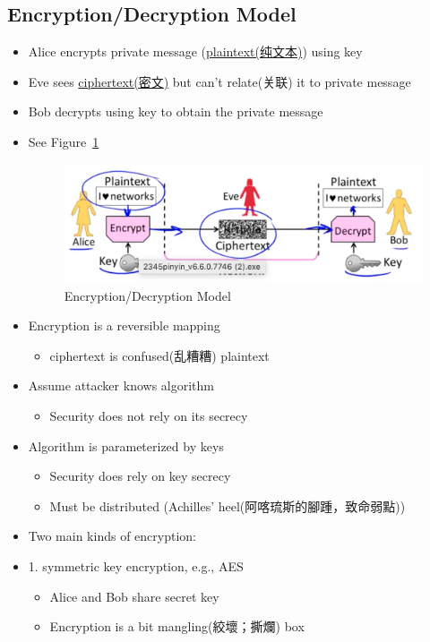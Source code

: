 \documentclass[12pt]{ctexart}   %
\begin{document}
	\subsection{Encryption/Decryption Model}
	\begin{itemize}
		\item Alice encrypts private message (\underline{plaintext(纯文本)}) using key 
		\item Eve sees \underline{ciphertext(密文)} but can't relate(关联) it to private message
		\item Bob decrypts using key to obtain the private message
		\item See Figure~\ref{fig:10-2-3}
		  
		\begin{figure}[h!] %
		\centering
		\includegraphics[scale=0.7]{images/10-2-3}
		\caption{Encryption/Decryption Model}
		\label{fig:10-2-3}
		\end{figure}

		\item Encryption is a reversible mapping
		\begin{itemize}
			\item ciphertext is confused(乱糟糟) plaintext
		\end{itemize}

		\item Assume attacker knows algorithm
		\begin{itemize}
			\item Security does not rely on its secrecy
		\end{itemize}

		\item Algorithm is parameterized by keys
		\begin{itemize}
			\item Security does rely on key secrecy
			\item Must be distributed (Achilles' heel(阿喀琉斯的腳踵，致命弱點))
		\end{itemize}

		\item  Two main kinds of encryption:
		\item {\color{blue} 1.} symmetric key encryption, e.g., AES
		\begin{itemize}
			\item Alice and Bob share secret key
			\item Encryption is a bit mangling(絞壞；撕爛) box
		\end{itemize}


\end{itemize}
\end{document}
